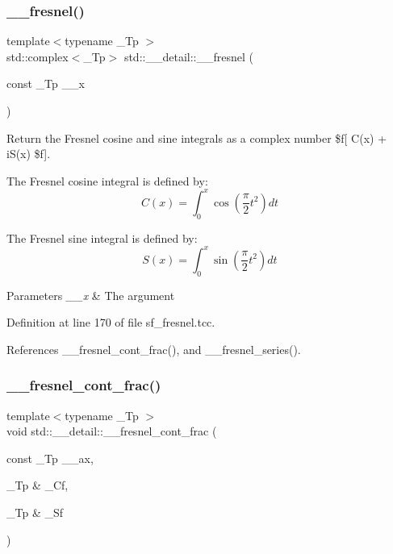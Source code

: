 \subsubsection{\texorpdfstring{\+\_\+\+\_\+fresnel()}{\_\_fresnel()}}
{\footnotesize\ttfamily template$<$typename \+\_\+\+Tp $>$ \\
std\+::complex$<$\+\_\+\+Tp$>$ std\+::\+\_\+\+\_\+detail\+::\+\_\+\+\_\+fresnel (\begin{DoxyParamCaption}\item[{const \+\_\+\+Tp}]{\+\_\+\+\_\+x }\end{DoxyParamCaption})}



Return the Fresnel cosine and sine integrals as a complex number \$f\mbox{[} C(x) + i\+S(x) \$f\mbox{]}. 

The Fresnel cosine integral is defined by\+: \[ C(x) = \int_0^x \cos(\frac{\pi}{2}t^2) dt \]

The Fresnel sine integral is defined by\+: \[ S(x) = \int_0^x \sin(\frac{\pi}{2}t^2) dt \]


\begin{DoxyParams}{Parameters}
{\em \+\_\+\+\_\+x} & The argument \\
\hline
\end{DoxyParams}


Definition at line 170 of file sf\+\_\+fresnel.\+tcc.



References \+\_\+\+\_\+fresnel\+\_\+cont\+\_\+frac(), and \+\_\+\+\_\+fresnel\+\_\+series().

\mbox{\label{namespacestd_1_1____detail_aeae8420e2fa1671f004066525adc99b6}} 
\subsubsection{\texorpdfstring{\+\_\+\+\_\+fresnel\+\_\+cont\+\_\+frac()}{\_\_fresnel\_cont\_frac()}}
{\footnotesize\ttfamily template$<$typename \+\_\+\+Tp $>$ \\
void std\+::\+\_\+\+\_\+detail\+::\+\_\+\+\_\+fresnel\+\_\+cont\+\_\+frac (\begin{DoxyParamCaption}\item[{const \+\_\+\+Tp}]{\+\_\+\+\_\+ax,  }\item[{\+\_\+\+Tp \&}]{\+\_\+\+Cf,  }\item[{\+\_\+\+Tp \&}]{\+\_\+\+Sf }\end{DoxyParamCaption})}



